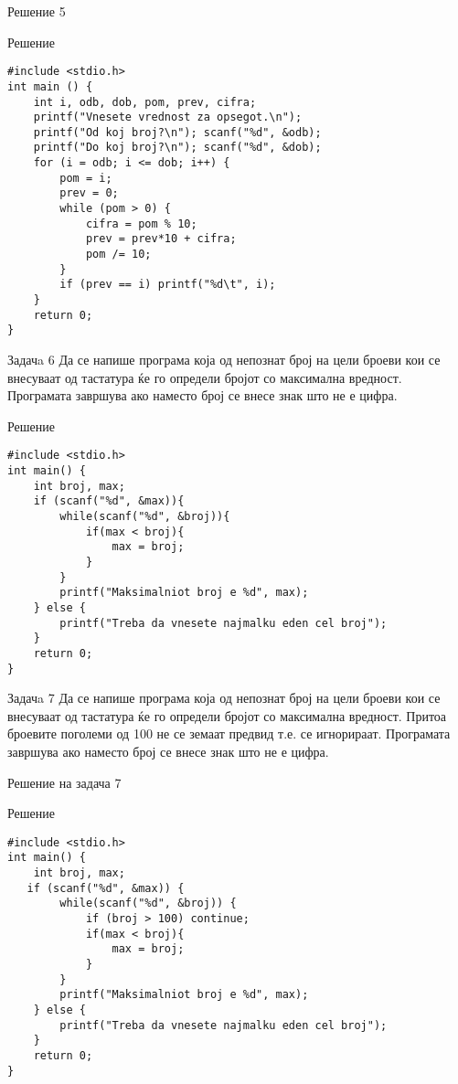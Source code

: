 \begin{frame}[fragile]{Решение 5}
\begin{exampleblock}{Решение}
\begin{lstlisting}
#include <stdio.h> 
int main () { 
    int i, odb, dob, pom, prev, cifra; 
    printf("Vnesete vrednost za opsegot.\n"); 
    printf("Od koj broj?\n"); scanf("%d", &odb); 
    printf("Do koj broj?\n"); scanf("%d", &dob); 
    for (i = odb; i <= dob; i++) { 
        pom = i; 
        prev = 0; 
        while (pom > 0) { 
            cifra = pom % 10; 
            prev = prev*10 + cifra; 
            pom /= 10; 
        } 
        if (prev == i) printf("%d\t", i); 
    } 
    return 0; 
}
\end{lstlisting}
\end{exampleblock}
\end{frame}


\begin{frame}[fragile]{Задачa 6}
\scriptsize{Да се напише програма која од непознат број на цели броеви кои се внесуваат 
од тастатура ќе го определи бројот со максимална вредност. 
Програмата завршува ако наместо број се внесе знак што не е цифра.}
\pause
\begin{exampleblock}{Решение}
\begin{lstlisting}
#include <stdio.h> 
int main() { 
    int broj, max; 
    if (scanf("%d", &max)){ 
        while(scanf("%d", &broj)){ 
            if(max < broj){ 
                max = broj; 
            } 
        } 
        printf("Maksimalniot broj e %d", max); 
    } else { 
        printf("Treba da vnesete najmalku eden cel broj"); 
    } 
    return 0; 
}
\end{lstlisting}
\end{exampleblock}
\end{frame}


\begin{frame}[fragile]{Задачa 7}
Да се напише програма која од непознат број на цели броеви кои се внесуваат од 
тастатура ќе го определи бројот со максимална вредност. 
Притоа броевите поголеми од 100 не се земаат предвид т.е. се игнорираат. 
Програмата завршува ако наместо број се внесе знак што не е цифра.
\end{frame}

\begin{frame}[fragile]{Решение на задача 7}
\begin{exampleblock}{Решение}
\begin{lstlisting}
#include <stdio.h> 
int main() { 
    int broj, max; 
   if (scanf("%d", &max)) { 
        while(scanf("%d", &broj)) { 
            if (broj > 100) continue; 
            if(max < broj){ 
                max = broj; 
            } 
        } 
        printf("Maksimalniot broj e %d", max); 
    } else { 
        printf("Treba da vnesete najmalku eden cel broj"); 
    } 
    return 0; 
}
\end{lstlisting}
\end{exampleblock}
\end{frame}


